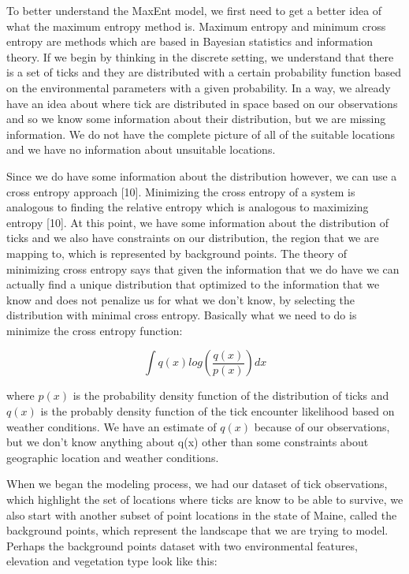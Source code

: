 \noindent To better understand the MaxEnt model, we first need to get a better idea of what the maximum entropy method is. Maximum entropy and minimum cross entropy are methods which are based in Bayesian statistics and information theory. If we begin by thinking in the discrete setting, we understand that there is a set of ticks and they are distributed with a certain probability function based on the environmental parameters with a given probability. In a way, we already have an idea about where tick are distributed in space based on our observations and so we know some information about their distribution, but we are missing information. We do not have the complete picture of all of the suitable locations and we have no information about unsuitable locations. \newline

\noindent Since we do have some information about the distribution however, we can use a cross entropy approach [10]. Minimizing the cross entropy of a system is analogous to finding the relative entropy which is analogous to maximizing entropy [10].   At this point, we have some information about the distribution of ticks and we also have constraints on our distribution, the region that we are mapping to, which is represented by background points. The theory of minimizing cross entropy says that given the information that we do have we can actually find a unique distribution that optimized to the information that we know and does not penalize us for what we don't know, by selecting the distribution with minimal cross entropy. Basically what we need to do is minimize the cross entropy function:  \newline

\begin{equation}
\int q(x)log(\frac{q(x)}{p(x)}) dx
\end{equation}

\noindent where $p(x)$ is the probability density function of the distribution of ticks and $q(x)$ is the probably density function of the tick encounter likelihood based on weather conditions. We have an estimate of $q(x)$ because of our observations, but we don't know anything about q(x) other than some constraints about geographic location and weather conditions.\newline

\noindent When we began the modeling process, we had our dataset of tick observations, which highlight the set of locations where ticks are know to be able to survive, we also start with another subset of point locations in the state of Maine, called the background points, which represent the landscape that we are trying to model. Perhaps the background points dataset with two environmental features, elevation and vegetation type look like this: 

